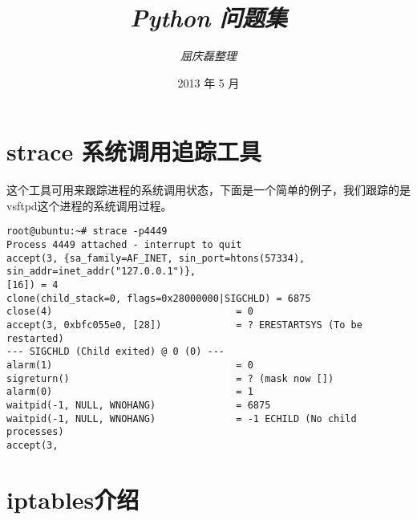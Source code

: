 \documentclass{article}
\begin{document}
\title{%
  {\huge \textit{Python 问题集}\\\smallskip}%
}

\author{\textit{屈庆磊整理} \\[3mm]
       }

\date{2013 年 5 月}

\maketitle

\begin{multicols}{2}
\tableofcontents
\end{multicols}


\section{strace 系统调用追踪工具}
这个工具可用来跟踪进程的系统调用状态，下面是一个简单的例子，我们跟踪的是
vsftpd这个进程的系统调用过程。

\begin{verbatim}
root@ubuntu:~# strace -p4449
Process 4449 attached - interrupt to quit
accept(3, {sa_family=AF_INET, sin_port=htons(57334), sin_addr=inet_addr("127.0.0.1")}, 
[16]) = 4
clone(child_stack=0, flags=0x28000000|SIGCHLD) = 6875
close(4)                                = 0
accept(3, 0xbfc055e0, [28])             = ? ERESTARTSYS (To be restarted)
--- SIGCHLD (Child exited) @ 0 (0) ---
alarm(1)                                = 0
sigreturn()                             = ? (mask now [])
alarm(0)                                = 1
waitpid(-1, NULL, WNOHANG)              = 6875
waitpid(-1, NULL, WNOHANG)              = -1 ECHILD (No child processes)
accept(3, 

\end{verbatim}
\section{iptables介绍}
\end{document}
